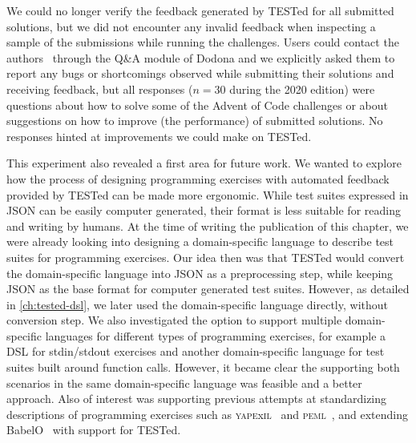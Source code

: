 \documentclass[../main]{subfiles}
\begin{document}
We could no longer verify the feedback generated by TESTed for all submitted solutions, but we did not encounter any invalid feedback when inspecting a sample of the submissions while running the challenges.
Users could contact the authors~\autocite{strijbolTESTedEducationalTesting2023} through the Q\&A module of Dodona and we explicitly asked them to report any bugs or shortcomings observed while submitting their solutions and receiving feedback, but all responses ($n=30$ during the 2020 edition) were questions about how to solve some of the Advent of Code challenges or about suggestions on how to improve (the performance) of submitted solutions.
No responses hinted at improvements we could make on TESTed.

This experiment also revealed a first area for future work.
We wanted to explore how the process of designing programming exercises with automated feedback provided by TESTed can be made more ergonomic.
While test suites expressed in JSON can be easily computer generated, their format is less suitable for reading and writing by humans.
At the time of writing the publication of this chapter, we were already looking into designing a domain-specific language to describe test suites for programming exercises.
Our idea then was that TESTed would convert the domain-specific language into JSON as a preprocessing step, while keeping JSON as the base format for computer generated test suites.
However, as detailed in \cref{ch:tested-dsl}, we later used the domain-specific language directly, without conversion step.
We also investigated the option to support multiple domain-specific languages for different types of programming exercises, for example a DSL for stdin/stdout exercises and another domain-specific language for test suites built around function calls.
However, it became clear the supporting both scenarios in the same domain-specific language was feasible and a better approach.
Also of interest was supporting previous attempts at standardizing descriptions of programming exercises such as \textsc{yape}x\textsc{il}~\autocite{paivaAnotherProgrammingExercises2020} and \textsc{peml}~\autocite{mishraProgrammingExerciseMarkup2023}, and extending BabelO~\autocite{queirosBabeLOExtensibleConverter2013} with support for TESTed.
\end{document}
